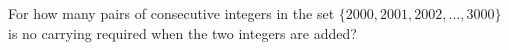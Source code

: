For how many pairs of consecutive integers in the set $\{2000,2001,2002,\ldots,3000\}$ is no carrying required when the two integers are added?
